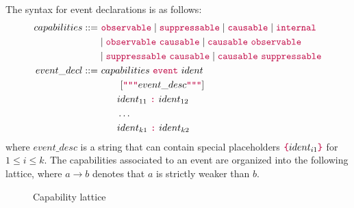 \documentclass[runningheads]{llncs}
\newcommand{\kw}[1]{{\color{purple}\texttt{#1}}}
\begin{document}
The syntax for event declarations is as follows:
\begin{align*}
  capabilities ::=&~\kw{observable} \mid \kw{suppressable} \mid \kw{causable} \mid \kw{internal}\\
                &\mid \kw{observable}~\kw{causable} \mid \kw{causable}~\kw{observable} \\
                &\mid \kw{suppressable}~\kw{causable} \mid \kw{causable}~\kw{suppressable} \\
  event\_decl ::=&~ capabilities~\kw{event}~ident~ \\
                 &\qquad~ [\kw{"""}event\_desc\kw{"""}]\\
                 &\qquad ident_{11}~\kw{:}~ident_{12}\\
                 &\qquad \dots\\
                 &\qquad ident_{k1}~\kw{:}~ident_{k2}
\end{align*}
where $event\_desc$ is a string that can contain special placeholders $\kw{\{}ident_{i1}\kw{\}}$
for $1 \leq i \leq k$. The capabilities associated to an event are organized into the following lattice, where $a \rightarrow b$ denotes that $a$ is strictly weaker than $b$.
\begin{figure}
  \centering
  \caption{Capability lattice}
\end{figure}
\end{document}
